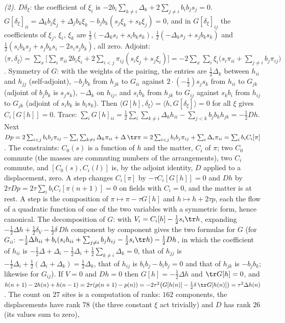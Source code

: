 \emph{(2).} $D\delta_{\xi}$: the coefficient of $\xi_{i}$ is $-2b_{i}\sum_{k\neq i}\Delta_{k} + 2\sum_{j\neq i}b_{i}b_{j}s_{j} = 0$. $G[\delta_{\xi}]_{ii} = \Delta_{k}b_{j}\xi_{j} + \Delta_{j}b_{k}\xi_{k} - b_{j}b_{k}(s_{j}\xi_{k} + s_{k}\xi_{j}) = 0$, and in $G[\delta_{\xi}]_{ij}$ the coefficients of $\xi_{j}$, $\xi_{i}$, $\xi_{k}$ are $\tfrac12(-\Delta_{k}s_{i} + s_{i}b_{k}s_{k})$, $\tfrac12(-\Delta_{k}s_{j} + s_{j}b_{k}s_{k})$ and $\tfrac12(s_{i}b_{k}s_{j} + s_{j}b_{k}s_{i} - 2s_{i}s_{j}b_{k})$, all zero. Adjoint: $\langle\pi, \delta_{\xi}\rangle = \sum_{x}\bigl[\sum_{i}\pi_{ii}\,2b_{i}\xi_{i} + 2\sum_{i<j}\pi_{ij}(s_{i}\xi_{j} + s_{j}\xi_{i})\bigr] = -2\sum_{x}\sum_{i}\xi_{i}\bigl(s_{i}\pi_{ii} + \sum_{j\neq i}b_{j}\pi_{ij}\bigr)$. Symmetry of $G$: with the weights of the pairing, the entries are $\tfrac12\Delta_{k}$ between $h_{ii}$ and $h_{jj}$ (self-adjoint), $-b_{j}b_{k}$ from $h_{jk}$ to $G_{ii}$ against $2\cdot(-\tfrac12)s_{j}s_{k}$ from $h_{ii}$ to $G_{jk}$ (adjoint of $b_{j}b_{k}$ is $s_{j}s_{k}$), $-\Delta_{k}$ on $h_{ij}$, and $s_{i}b_{k}$ from $h_{jk}$ to $G_{ij}$ against $s_{k}b_{i}$ from $h_{ij}$ to $G_{jk}$ (adjoint of $s_{i}b_{k}$ is $b_{i}s_{k}$). Then $\langle G[h], \delta_{\xi}\rangle = \langle h, G[\delta_{\xi}]\rangle = 0$ for all $\xi$ gives $C_{i}[G[h]] = 0$. Trace: $\sum_{i}G[h]_{ii} = \tfrac12\sum_{i}\sum_{k\neq i}\Delta_{k}h_{ii} - \sum_{j<k}b_{j}b_{k}h_{jk} = -\tfrac12 Dh$. Next $Dp = 2\sum_{i<j}b_{i}b_{j}\pi_{ij} - \sum_{i}\sum_{k\neq i}\Delta_{k}\pi_{ii} + \Delta\,\tr\pi = 2\sum_{i<j}b_{i}b_{j}\pi_{ij} + \sum_{i}\Delta_{i}\pi_{ii} = \sum_{i}b_{i}C_{i}[\pi]$. The constraints: $C_{0}(s)$ is a function of $h$ and the matter, $C_{i}$ of $\pi$; two $C_{0}$ commute (the masses are commuting numbers of the arrangements), two $C_{i}$ commute, and $[C_{0}(s), C_{i}(l)]$ is, by the adjoint identity, $D$ applied to a displacement, zero. A step changes $C_{i}[\pi]$ by $-\tau C_{i}[G[h]] = 0$ and $Dh$ by $2\tau Dp = 2\tau\sum_{i}b_{i}C_{i}[\pi(n+1)] = 0$ on fields with $C_{i} = 0$, and the matter is at rest. A step is the composition of $\pi \mapsto \pi - \tau G[h]$ and $h \mapsto h + 2\tau p$, each the flow of a quadratic function of one of the two variables with a symmetric form, hence canonical. The decomposition of $G$: with $V_{i} = C_{i}[h] - \tfrac12 s_{i}\tr h$, expanding $-\tfrac12\Delta h + \tfrac12\delta_{V} - \tfrac12\delta\,Dh$ component by component gives the two formulas for $G$ (for $G_{ii}$: $-\tfrac12\Delta h_{ii} + b_{i}(s_{i}h_{ii} + \sum_{j\neq i}b_{j}h_{ij} - \tfrac12 s_{i}\tr h) - \tfrac12 Dh$, in which the coefficient of $h_{ii}$ is $-\tfrac12\Delta + \Delta_{i} - \tfrac12\Delta_{i} + \tfrac12\sum_{k\neq i}\Delta_{k} = 0$, that of $h_{jj}$ is $-\tfrac12\Delta_{i} + \tfrac12(\Delta_{i} + \Delta_{k}) = \tfrac12\Delta_{k}$, that of $h_{ij}$ is $b_{i}b_{j} - b_{i}b_{j} = 0$ and that of $h_{jk}$ is $-b_{j}b_{k}$; likewise for $G_{ij}$). If $V = 0$ and $Dh = 0$ then $G[h] = -\tfrac12\Delta h$ and $\tr G[h] = 0$, and $h(n+1) - 2h(n) + h(n-1) = 2\tau(p(n+1) - p(n)) = -2\tau^{2}\bigl(G[h(n)] - \tfrac12\delta\,\tr G[h(n)]\bigr) = \tau^{2}\Delta h(n)$. The count on $27$ sites is a computation of ranks: $162$ components, the displacements have rank $78$ (the three constant $\xi$ act trivially) and $D$ has rank $26$ (its values sum to zero), 